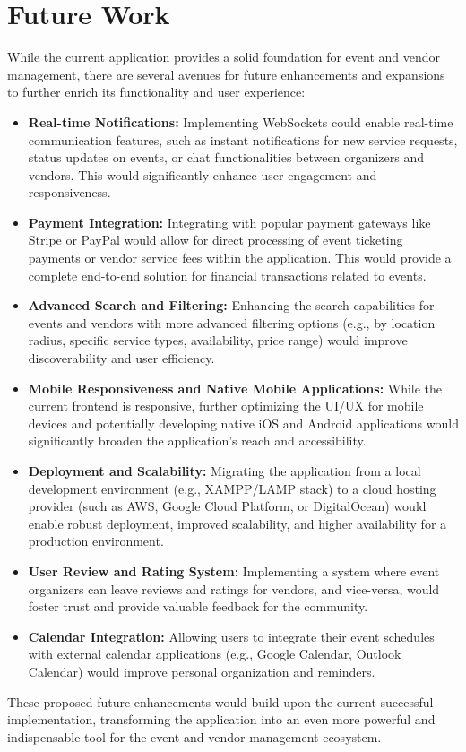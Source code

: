 \documentclass{report}
\begin{document}
\section{Future Work}
\label{sec:future_work}
While the current application provides a solid foundation for event and vendor management, there are several avenues for future enhancements and expansions to further enrich its functionality and user experience:
\begin{itemize}
    \item \textbf{Real-time Notifications:} Implementing WebSockets could enable real-time communication features, such as instant notifications for new service requests, status updates on events, or chat functionalities between organizers and vendors. This would significantly enhance user engagement and responsiveness.
    \item \textbf{Payment Integration:} Integrating with popular payment gateways like Stripe or PayPal would allow for direct processing of event ticketing payments or vendor service fees within the application. This would provide a complete end-to-end solution for financial transactions related to events.
    \item \textbf{Advanced Search and Filtering:} Enhancing the search capabilities for events and vendors with more advanced filtering options (e.g., by location radius, specific service types, availability, price range) would improve discoverability and user efficiency.
    \item \textbf{Mobile Responsiveness and Native Mobile Applications:} While the current frontend is responsive, further optimizing the UI/UX for mobile devices and potentially developing native iOS and Android applications would significantly broaden the application's reach and accessibility.
    \item \textbf{Deployment and Scalability:} Migrating the application from a local development environment (e.g., XAMPP/LAMP stack) to a cloud hosting provider (such as AWS, Google Cloud Platform, or DigitalOcean) would enable robust deployment, improved scalability, and higher availability for a production environment.
    \item \textbf{User Review and Rating System:} Implementing a system where event organizers can leave reviews and ratings for vendors, and vice-versa, would foster trust and provide valuable feedback for the community.
    \item \textbf{Calendar Integration:} Allowing users to integrate their event schedules with external calendar applications (e.g., Google Calendar, Outlook Calendar) would improve personal organization and reminders.
\end{itemize}
These proposed future enhancements would build upon the current successful implementation, transforming the application into an even more powerful and indispensable tool for the event and vendor management ecosystem.
\end{document}
